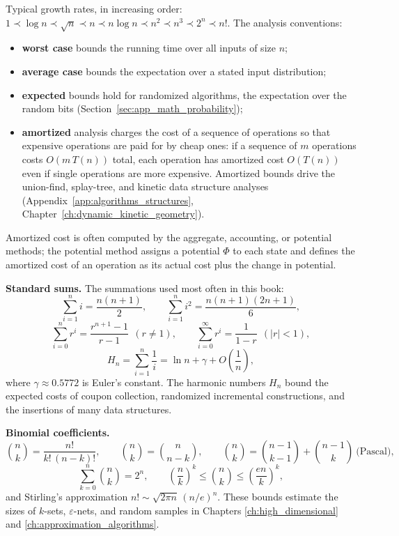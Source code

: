 Typical growth rates, in increasing order:
$1 \prec \log n \prec \sqrt{n} \prec n \prec n\log n \prec n^2 \prec n^3
\prec 2^n \prec n!$. The analysis conventions:
\begin{itemize}
  \item \textbf{worst case} bounds the running time over all inputs of size
    $n$;
  \item \textbf{average case} bounds the expectation over a stated input
    distribution;
  \item \textbf{expected} bounds hold for randomized algorithms, the
    expectation over the random bits (Section~\ref{sec:app_math_probability});
  \item \textbf{amortized} analysis charges the cost of a sequence of
    operations so that expensive operations are paid for by cheap ones: if a
    sequence of $m$ operations costs $O(m\,T(n))$ total, each operation has
    amortized cost $O(T(n))$ even if single operations are more expensive.
    Amortized bounds drive the union-find, splay-tree, and kinetic data
    structure analyses (Appendix~\ref{app:algorithms_structures},
    Chapter~\ref{ch:dynamic_kinetic_geometry}).
\end{itemize}
Amortized cost is often computed by the aggregate, accounting, or potential
methods; the potential method assigns a potential $\Phi$ to each state and
defines the amortized cost of an operation as its actual cost plus the change
in potential.

\medskip
\noindent\textbf{Standard sums.}
The summations used most often in this book:
\[
  \sum_{i=1}^{n} i = \frac{n(n+1)}{2},
  \qquad
  \sum_{i=1}^{n} i^2 = \frac{n(n+1)(2n+1)}{6},
\]
\[
  \sum_{i=0}^{n} r^i = \frac{r^{n+1} - 1}{r - 1}\ \ (r \neq 1),
  \qquad
  \sum_{i=0}^{\infty} r^i = \frac{1}{1 - r}\ \ (|r| < 1),
\]
\[
  H_n = \sum_{i=1}^{n} \frac{1}{i} = \ln n + \gamma + O\!\left(\frac{1}{n}\right),
\]
where $\gamma \approx 0.5772$ is Euler's constant. The harmonic numbers
$H_n$ bound the expected costs of coupon collection, randomized incremental
constructions, and the insertions of many data structures.

\medskip
\noindent\textbf{Binomial coefficients.}
\[
  \binom{n}{k} = \frac{n!}{k!\,(n-k)!},
  \qquad
  \binom{n}{k} = \binom{n}{n-k},
  \qquad
  \binom{n}{k} = \binom{n-1}{k-1} + \binom{n-1}{k}\ \text{(Pascal)},
\]
\[
  \sum_{k=0}^{n} \binom{n}{k} = 2^n,
  \qquad
  \left(\frac{n}{k}\right)^k \le \binom{n}{k} \le \left(\frac{e n}{k}\right)^k,
\]
and Stirling's approximation $n! \sim \sqrt{2\pi n}\,(n/e)^n$. These bounds
estimate the sizes of $k$-sets, $\varepsilon$-nets, and random samples in
Chapters \ref{ch:high_dimensional} and \ref{ch:approximation_algorithms}.

